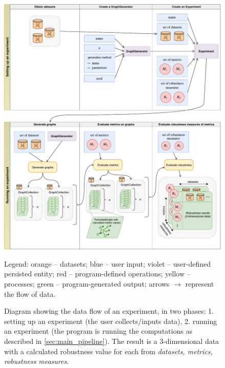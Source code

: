 \begin{figure}
    \includegraphics[width=\linewidth]{main_data_flow.pdf}
    \caption{Diagram showing the data flow of an experiment, in two phases: 1. setting up an experiment (the user collects/inputs data), 2. running an experiment (the program is running the computations as described in \autoref{sec:main_pipeline}). The result is a 3-dimensional data with a calculated robustness value for each from \textsl{datasets, metrics, robustness measures}.}\label{fig:main_data_flow}
    \footnotesize\justify\vspace{-0.4\baselineskip}
    Legend: \textcolor{diag-orange}{orange} -- datasets; \textcolor{diag-blue}{blue} -- user input; \textcolor{diag-violet}{violet} -- user-defined persisted entity; \textcolor{diag-red}{red} -- program-defined operations; \textcolor{diag-yellow}{yellow} -- processes; \textcolor{diag-green}{green} -- program-generated output; arrows $\rightarrow$ represent the flow of data.
\end{figure}
